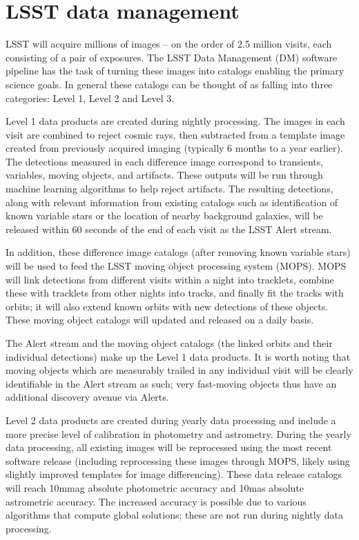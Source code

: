 \documentclass{iau}
\begin{document}
\section{LSST data management}

LSST will acquire millions of images -- on the order of 2.5 million
visits, each consisting of a pair of exposures. The LSST Data
Management (DM) software pipeline has the task of turning these images
into catalogs enabling the primary science goals. In general these
catalogs can be thought of as falling into three categories: Level 1,
Level 2 and Level 3.

Level 1 data products are created during nightly processing. The
images in each visit are combined to reject cosmic rays, then
subtracted from a template image created from previously acquired
imaging (typically 6 months to a year earlier). The detections
measured in each difference image correspond to transients, variables,
moving objects, and artifacts. These outputs will be run through
machine learning algorithms to help reject artifacts. The resulting
detections, along with relevant information from existing catalogs
such as identification of known variable stars or the location of
nearby background galaxies, will be released within 60 seconds of the
end of each visit as the LSST Alert stream.

In addition, these difference image catalogs (after removing known
variable stars) will be used to feed the LSST moving object processing
system (MOPS). MOPS will link detections from different visits within
a night into tracklets, combine these with tracklets from
other nights into tracks, and finally fit the tracks with orbits; it will also extend
known orbits with new detections of these objects. These moving object
catalogs will updated and released on a daily basis.

The Alert stream and the moving object catalogs (the linked orbits and
their individual detections) make up the Level 1 data products. It is
worth noting that moving objects which are measurably trailed in any
individual visit will be clearly identifiable in the Alert stream as
such; very fast-moving objects thus have an additional discovery
avenue via Alerts.

Level 2 data products are created during yearly data processing and
include a more precise level of calibration in photometry and
astrometry. During the yearly data processing, all existing images
will be reprocessed using the most recent software release (including
reprocessing these images through MOPS, likely using slightly
improved templates for image differencing). These
data release catalogs will reach 10mmag absolute photometric accuracy
and 10mas absolute astrometric accuracy. The increased accuracy is
possible due to various algorithms that compute global solutions;
these are not run during nightly data processing.
\end{document}

